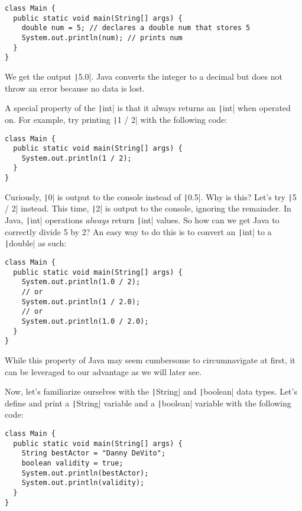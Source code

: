 \documentclass{article}
\begin{document}
\begin{verbatim}
class Main {
  public static void main(String[] args) {
    double num = 5; // declares a double num that stores 5
    System.out.println(num); // prints num
  }
}
\end{verbatim}

We get the output \texttt|5.0|. Java converts the integer to a decimal but does not throw an error because no data is lost.

\vspace{0.5cm}

A special property of the \texttt|int| is that it always returns an \texttt|int| when operated on. For example, try printing \texttt|1 / 2| with the following code:

\begin{verbatim}
class Main {
  public static void main(String[] args) {
    System.out.println(1 / 2);
  }
}
\end{verbatim}

Curiously, \texttt|0| is output to the console instead of \texttt|0.5|. Why is this? Let's try \texttt|5 / 2| instead. This time, \texttt|2| is output to the console, ignoring the remainder. In Java, \texttt|int| operations \emph{always} return \texttt|int| values. So how can we get Java to correctly divide 5 by 2? An easy way to do this is to convert an \texttt|int| to a \texttt|double| as such:

\begin{verbatim}
class Main {
  public static void main(String[] args) {
    System.out.println(1.0 / 2);
    // or
    System.out.println(1 / 2.0);
    // or
    System.out.println(1.0 / 2.0);
  }
}
\end{verbatim}

While this property of Java may seem cumbersome to circumnavigate at first, it can be leveraged to our advantage as we will later see.

\vspace{0.5cm}

Now, let's familiarize ourselves with the \textcolor{BorlandBlue}{\texttt|String|} and \texttt|boolean| data types. Let's define and print a \textcolor{BorlandBlue}{\texttt|String|} variable and a \texttt|boolean| variable with the following code:

\begin{verbatim}
class Main {
  public static void main(String[] args) {
    String bestActor = "Danny DeVito";
    boolean validity = true;
    System.out.println(bestActor);
    System.out.println(validity);
  }
}
\end{verbatim}
\end{document}
